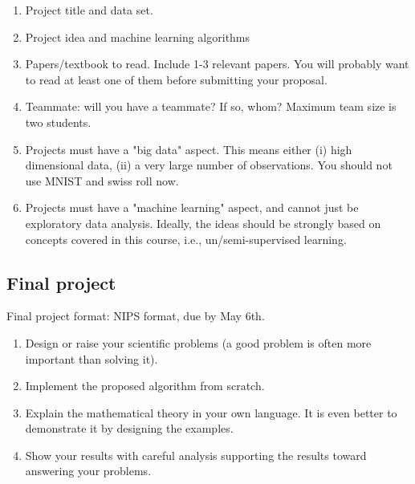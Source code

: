 \documentclass[a4paper,10pt]{article}
\begin{document}
\begin{enumerate}
\item Project title and data set. 


\item Project idea and machine learning algorithms

\item Papers/textbook to read. Include 1-3 relevant papers. You will probably want to read at least one of them before submitting your proposal.

\item Teammate: will you have a teammate? If so, whom? Maximum team size is two students.

\item Projects must have a "big data" aspect. This means either (i) high dimensional data, (ii) a very large number of observations. You should not use MNIST and swiss roll now. 

\item Projects must have a "machine learning" aspect, and cannot just be exploratory data analysis. Ideally, the ideas should be strongly based on concepts covered in this course, i.e., un/semi-supervised learning. 

\end{enumerate}

\subsection*{Final project}
Final project format: NIPS format, due by May 6th.
\begin{enumerate}
\item Design or raise your scientific problems (a good problem is often more important than solving it). 

\item Implement the proposed algorithm from scratch.   

\item Explain the mathematical theory in your own language. It is even better to demonstrate it by designing the examples. 

\item Show your results with careful analysis supporting the results toward answering your problems.  




\end{enumerate}
\end{document}
